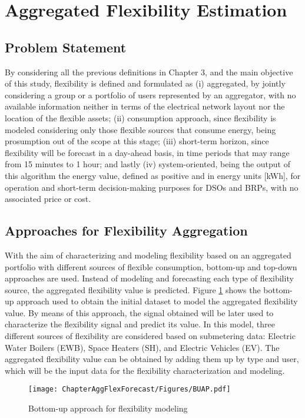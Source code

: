 \section{Aggregated Flexibility Estimation}\label{Sect:ProblemStatement}

\subsection{Problem Statement} \label{sec:problemstatement}
By considering all the previous definitions in Chapter 3, and the main objective of this study, flexibility is defined and formulated as (i) aggregated, by jointly considering a group or a portfolio of users represented by an aggregator, with no available information neither in terms of the electrical network layout nor the location of the flexible assets; (ii) consumption approach, since flexibility is modeled considering only those flexible sources that consume energy, being prosumption out of the scope at this stage; (iii) short-term horizon, since flexibility will be forecast in a day-ahead basis, in time periods that may range from 15 minutes to 1 hour; and lastly (iv) system-oriented, being the output of this algorithm the energy value, defined as positive and in energy units [kWh], for operation and short-term decision-making purposes for DSOs and BRPs, with no associated price or cost. 

\subsection{Approaches for Flexibility Aggregation}
With the aim of characterizing and modeling flexibility based on an aggregated portfolio with different sources of flexible consumption, bottom-up and top-down approaches are used. Instead of modeling and forecasting each type of flexibility source, the aggregated flexibility value is predicted. Figure \ref{fig:bottom_up} shows the bottom-up approach used to obtain the initial dataset to model the aggregated flexibility value. By means of this approach, the signal obtained will be later used to characterize the flexibility signal and predict its value. In this model, three different sources of flexibility are considered based on submetering data: Electric Water Boilers (EWB), Space Heaters (SH), and Electric Vehicles (EV). The aggregated flexibility value can be obtained by adding them up by type and user, which will be the input data for the flexibility characterization and modeling.

\begin{figure}[htbp]
\centerline{\texttt{[image: ChapterAggFlexForecast/Figures/BUAP.pdf]}}
\caption{Bottom-up approach for flexibility modeling}
\label{fig:bottom_up}
\end{figure}

